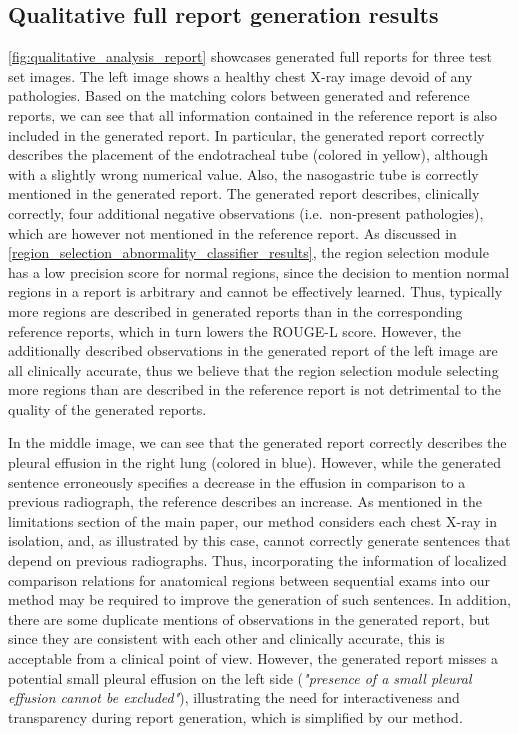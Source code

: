\documentclass[10pt,twocolumn,letterpaper]{article}
\begin{document}
\subsection{Qualitative full report generation results}
\cref{fig:qualitative_analysis_report} showcases generated full reports for three test set images. 
The left image shows a healthy chest X-ray image devoid of any pathologies. Based on the matching colors between generated and reference reports, we can see that all information contained in the reference report is also included in the generated report. In particular, the generated report correctly describes the placement of the endotracheal tube (colored in yellow), although with a slightly wrong numerical value. Also, the nasogastric tube is correctly mentioned in the generated report. 
The generated report describes, clinically correctly, four additional negative observations (i.e.\ non-present pathologies), which are however not mentioned in the reference report. As discussed in \cref{region_selection_abnormality_classifier_results}, the region selection module has a low precision score for normal regions, since the decision to mention normal regions in a report is arbitrary and cannot be effectively learned. Thus, typically more regions are described in generated reports than in the corresponding reference reports, which in turn lowers the ROUGE-L score. However, the additionally described observations in the generated report of the left image are all clinically accurate, thus we believe that the region selection module selecting more regions than are described in the reference report is not detrimental to the quality of the generated reports.

In the middle image, we can see that the generated report correctly describes the pleural effusion in the right lung (colored in blue). However, while the generated sentence erroneously specifies a decrease in the effusion in comparison to a previous radiograph, the reference describes an increase. As mentioned in the limitations section of the main paper, our method considers each chest X-ray in isolation, and, as illustrated by this case, cannot correctly generate sentences that depend on previous radiographs. 
Thus, incorporating the information of localized comparison relations for anatomical regions between sequential exams into our method may be required to improve the generation of such sentences. In addition, there are some duplicate mentions of observations in the generated report, but since they are consistent with each other and clinically accurate, this is acceptable from a clinical point of view. However, the generated report misses a potential small pleural effusion on the left side (\emph{"presence of a small pleural effusion cannot be excluded"}), illustrating the need for interactiveness and transparency during report generation, which is simplified by our method.
\end{document}
